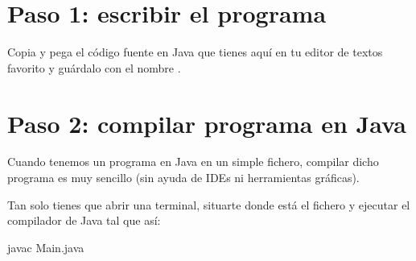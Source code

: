 \documentclass[letterpaper,10pt,spanish]{sphinxmanual}
\begin{document}
\section{Paso 1: escribir el programa}
\label{\detokenize{lab2:paso-1-escribir-el-programa}}
\sphinxAtStartPar
Copia y pega el código fuente en Java que tienes aquí en tu editor de textos favorito y guárdalo con el nombre .

\begin{sphinxVerbatim}[commandchars=\\\{\}]
   
       \PYG{o}{[}\PYG{o}{]}  
                 
              
\end{sphinxVerbatim}


\section{Paso 2: compilar programa en Java}
\label{\detokenize{lab2:paso-2-compilar-programa-en-java}}
\sphinxAtStartPar
Cuando tenemos un programa en Java en un simple fichero, compilar dicho programa es muy sencillo (sin ayuda de IDEs ni herramientas gráficas).

\sphinxAtStartPar
Tan solo tienes que abrir una terminal, situarte donde está el fichero  y ejecutar el compilador de Java  tal que así:

\begin{sphinxVerbatim}[commandchars=\\\{\}]
 javac Main.java
\end{sphinxVerbatim}
\end{document}
